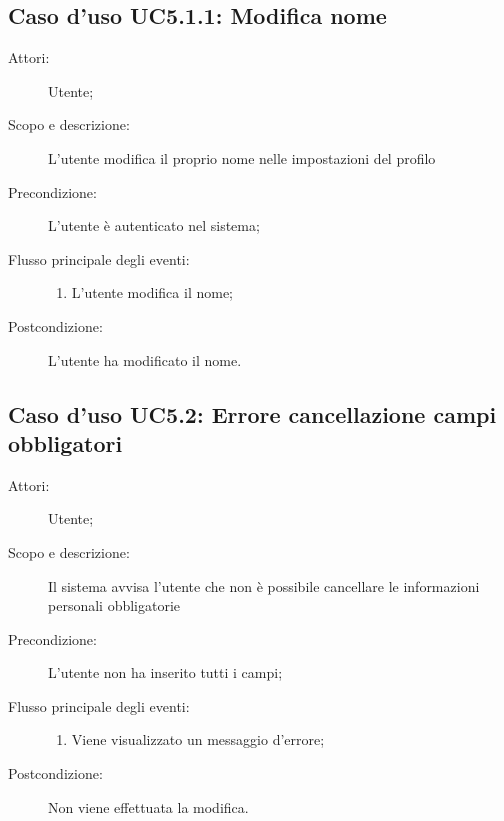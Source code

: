 \subsection{Caso d'uso UC5.1.1: Modifica nome}\begin{description}
\item[Attori:] Utente;
\item[Scopo e descrizione:] L'utente modifica il proprio nome nelle impostazioni del profilo
      \item[Precondizione:] L'utente è autenticato nel sistema;

        \item[Flusso principale degli eventi:] \begin{enumerate}
          \item L'utente modifica il nome;

      \end{enumerate}
    \item[Postcondizione:] L'utente ha modificato il nome.
  \end{description}
\hypertarget{UC5.2}{}
\subsection{Caso d'uso UC5.2: Errore cancellazione campi obbligatori}\begin{description}
\item[Attori:] Utente;
\item[Scopo e descrizione:] Il sistema avvisa l'utente che non è possibile cancellare le informazioni personali obbligatorie
      \item[Precondizione:] L'utente non ha inserito tutti i campi;

        \item[Flusso principale degli eventi:] \begin{enumerate}
          \item Viene visualizzato un messaggio d'errore;

      \end{enumerate}
    \item[Postcondizione:] Non viene effettuata la modifica.
  \end{description}
\hypertarget{UC6}{}
